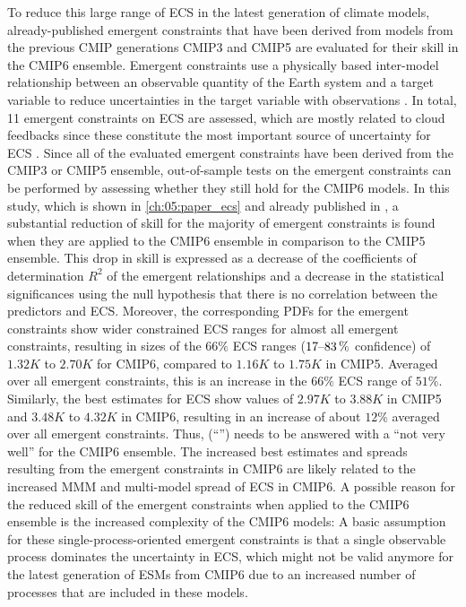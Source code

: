 To reduce this large range of \ac{ECS} in the latest generation of climate
models, already-published emergent constraints that have been derived from
models from the previous \ac{CMIP} generations \acs{CMIP}3 and \acs{CMIP}5 are
evaluated for their skill in the \acs{CMIP}6 ensemble. Emergent constraints use
a physically based inter-model relationship between an observable quantity of
the Earth system and a target variable to reduce uncertainties in the target
variable with observations \autocite{Allen2002}. In total, 11 emergent
constraints on \ac{ECS} are assessed, which are mostly related to cloud
feedbacks since these constitute the most important source of uncertainty for
\ac{ECS} \autocite{Boucher2013, Flato2013}. Since all of the evaluated emergent
constraints have been derived from the \acs{CMIP}3 or \acs{CMIP}5 ensemble,
out-of-sample tests on the emergent constraints can be performed by assessing
whether they still hold for the \acs{CMIP}6 models. In this study, which is
shown in \cref{ch:05:paper_ecs} and already published in
\textcite{Schlund2020a}, a substantial reduction of skill for the majority of
emergent constraints is found when they are applied to the \acs{CMIP}6 ensemble
in comparison to the \acs{CMIP}5 ensemble. This drop in skill is expressed as a
decrease of the coefficients of determination $R^2$ of the emergent
relationships and a decrease in the statistical significances using the null
hypothesis that there is no correlation between the predictors and \ac{ECS}.
Moreover, the corresponding \acp{PDF} for the emergent constraints show wider
constrained \ac{ECS} ranges for almost all emergent constraints, resulting in
sizes of the $66 \unit{\%}$ \ac{ECS} ranges ($\rangeunit{17}{83}{\%}$
confidence) of $1.32 \unit{K}$ to $2.70 \unit{K}$ for \acs{CMIP}6, compared to
$1.16 \unit{K}$ to $1.75 \unit{K}$ in \acs{CMIP}5. Averaged over all emergent
constraints, this is an increase in the $66 \unit{\%}$ \ac{ECS} range of $51
\unit{\%}$. Similarly, the best estimates for \ac{ECS} show values of $2.97
\unit{K}$ to $3.88 \unit{K}$ in \acs{CMIP}5 and $3.48 \unit{K}$ to $4.32
\unit{K}$ in \acs{CMIP}6, resulting in an increase of about $12 \unit{\%}$
averaged over all emergent constraints. Thus, 
(\enquote{\KeyScienceQuestionTwo{}}) needs to be answered with a \enquote{not
  very well} for the \acs{CMIP}6 ensemble. The increased best estimates and
spreads resulting from the emergent constraints in \acs{CMIP}6 are likely
related to the increased \ac{MMM} and multi-model spread of \ac{ECS} in
\acs{CMIP}6. A possible reason for the reduced skill of the emergent
constraints when applied to the \acs{CMIP}6 ensemble is the increased
complexity of the \acs{CMIP}6 models: A basic assumption for these
single-process-oriented emergent constraints is that a single observable
process dominates the uncertainty in \ac{ECS}, which might not be valid anymore
for the latest generation of \acp{ESM} from \acs{CMIP}6 due to an increased
number of processes that are included in these models.

